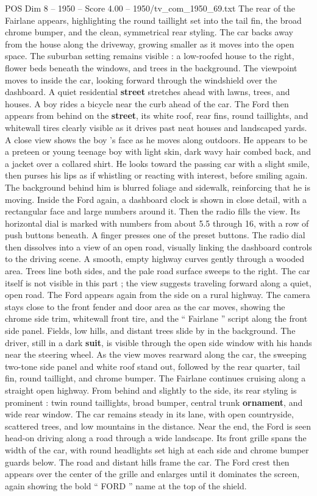\begin{textsample}{POS Dim 8 – 1950 – Score 4.00 – 1950/tv\_com\_1950\_69.txt}
The rear of the Fairlane appears, highlighting the round taillight set into the tail fin, the broad chrome bumper, and the clean, symmetrical rear styling.
The car backs away from the house along the driveway, growing smaller as it moves into the open space.
The suburban setting remains visible : a low-roofed house to the right, flower beds beneath the windows, and trees in the background.
The viewpoint moves to inside the car, looking forward through the windshield over the dashboard.
A quiet residential \textbf{street} stretches ahead with lawns, trees, and houses.
A boy rides a bicycle near the curb ahead of the car.
The Ford then appears from behind on the \textbf{street}, its white roof, rear fins, round taillights, and whitewall tires clearly visible as it drives past neat houses and landscaped yards.
A close view shows the boy ’s face as he moves along outdoors.
He appears to be a preteen or young teenage boy with light skin, dark wavy hair combed back, and a jacket over a collared shirt.
He looks toward the passing car with a slight smile, then purses his lips as if whistling or reacting with interest, before smiling again.
The background behind him is blurred foliage and sidewalk, reinforcing that he is moving.
Inside the Ford again, a dashboard clock is shown in close detail, with a rectangular face and large numbers around it.
Then the radio fills the view.
Its horizontal dial is marked with numbers from about 5.5 through 16, with a row of push buttons beneath.
A finger presses one of the preset buttons.
The radio dial then dissolves into a view of an open road, visually linking the dashboard controls to the driving scene.
A smooth, empty highway curves gently through a wooded area.
Trees line both sides, and the pale road surface sweeps to the right.
The car itself is not visible in this part ; the view suggests traveling forward along a quiet, open road.
The Ford appears again from the side on a rural highway.
The camera stays close to the front fender and door area as the car moves, showing the chrome side trim, whitewall front tire, and the “ Fairlane ” script along the front side panel.
Fields, low hills, and distant trees slide by in the background.
The driver, still in a dark \textbf{suit}, is visible through the open side window with his hands near the steering wheel.
As the view moves rearward along the car, the sweeping two-tone side panel and white roof stand out, followed by the rear quarter, tail fin, round taillight, and chrome bumper.
The Fairlane continues cruising along a straight open highway.
From behind and slightly to the side, its rear styling is prominent : twin round taillights, broad bumper, central trunk \textbf{ornament}, and wide rear window.
The car remains steady in its lane, with open countryside, scattered trees, and low mountains in the distance.
Near the end, the Ford is seen head-on driving along a road through a wide landscape.
Its front grille spans the width of the car, with round headlights set high at each side and chrome bumper guards below.
The road and distant hills frame the car.
The Ford crest then appears over the center of the grille and enlarges until it dominates the screen, again showing the bold “ FORD ” name at the top of the shield.

\end{textsample}

